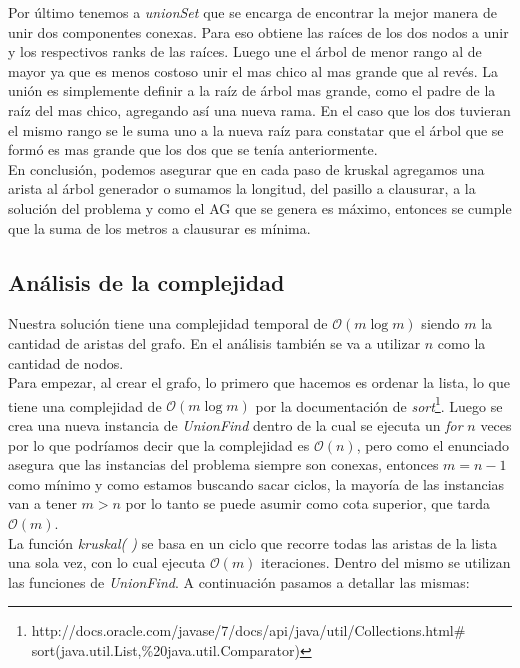 Por último tenemos a \textit{unionSet} que se encarga de encontrar la mejor manera de unir dos componentes conexas. Para eso obtiene las raíces de los dos nodos a unir y los respectivos ranks de las raíces. Luego une el árbol de menor rango al de mayor ya que es menos costoso unir el mas chico al mas grande que al revés. La unión es simplemente definir a la raíz de árbol mas grande, como el padre de la raíz del mas chico, agregando así una nueva rama. En el caso que los dos tuvieran el mismo rango se le suma uno a la nueva raíz para constatar que el árbol que se formó es mas grande que los dos que se tenía anteriormente.\\

En conclusión, podemos asegurar que en cada paso de kruskal agregamos una arista al árbol generador o sumamos la longitud, del pasillo a clausurar, a la solución del problema y como el AG que se genera es máximo, entonces se cumple que la suma de los metros a clausurar es mínima.

\subsection{Análisis de la complejidad}
Nuestra solución tiene una complejidad temporal de $\mathcal{O}(m\log{}m)$ siendo $m$ la cantidad de aristas del grafo. En el análisis también se va a utilizar $n$ como la cantidad de nodos.\\

Para empezar, al crear el grafo, lo primero que hacemos es ordenar la lista, lo que tiene una complejidad de $\mathcal{O}(m\log{}m)$ por la documentación de \textit{sort}\footnote{http://docs.oracle.com/javase/7/docs/api/java/util/Collections.html$\#$sort(java.util.List,\%20java.util.Comparator)}. Luego se crea una nueva instancia de \textit{UnionFind} dentro de la cual se ejecuta un \emph{for} $n$ veces por lo que podríamos decir que la complejidad es $\mathcal{O}(n)$, pero como el enunciado asegura que las instancias del problema siempre son conexas, entonces $m = n-1$ como mínimo y como estamos buscando sacar ciclos, la mayoría de las instancias van a tener $m > n$ por lo tanto se puede asumir como cota superior, que tarda $\mathcal{O}(m)$.\\

La función \textit{kruskal( )} se basa en un ciclo que recorre todas las aristas de la lista una sola vez, con lo cual ejecuta $\mathcal{O}(m)$ iteraciones. Dentro del mismo se utilizan las funciones de \textit{UnionFind}. A continuación pasamos a detallar las mismas:

